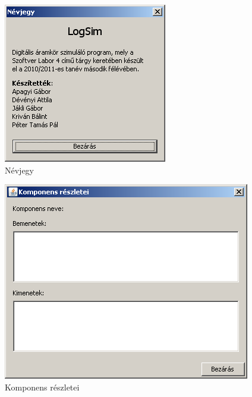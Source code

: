 \begin{figure}[H]
\begin{center}
\includegraphics[width=2.8125in]{chapters/chapter11/screenshots/about.png}
\caption{Névjegy}
\label{fig:about}
\end{center}
\end{figure}

\begin{figure}[H]
\begin{center}
\includegraphics[width=4.25in]{chapters/chapter11/screenshots/details.png}
\caption{Komponens részletei}
\label{fig:gui_szimseb}
\end{center}
\end{figure}

